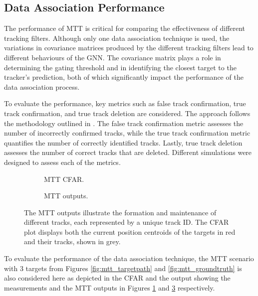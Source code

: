 \subsection{Data Association Performance}

The performance of \ac{MTT} is critical for comparing the effectiveness of different tracking filters. Although only one data association technique is used, the variations in covariance matrices produced by the different tracking filters lead to different behaviours of the \ac{GNN}. The covariance matrix plays a role in determining the gating threshold and in identifying the closest target to the tracker's prediction, both of which significantly impact the performance of the data association process.

To evaluate the performance, key metrics such as false track confirmation, true track confirmation, and true track deletion are considered. The approach follows the methodology outlined in \cite{kennedy2014powerful}. The false track confirmation metric assesses the number of incorrectly confirmed tracks, while the true track confirmation metric quantifies the number of correctly identified tracks. Lastly, true track deletion assesses the number of correct tracks that are deleted. Different simulations were designed to assess each of the metrics.
\newline
\begin{figure}[H]
    \centering
    \begin{subfigure}[b]{0.49\linewidth}
        \centering
        
        \caption{MTT CFAR.}
        \label{mtt_3_cfar}
    \end{subfigure}
    \hfill
    \begin{subfigure}[b]{0.49\linewidth}
        \centering
        
        \caption{MTT outputs.}
        \label{mtt_3_track}
    \end{subfigure}
    \caption{The MTT outputs illustrate the formation and maintenance of different tracks, each represented by a unique track ID. The CFAR plot displays both the current position centroids of the targets in red and their tracks, shown in grey.}
\end{figure}

To evaluate the performance of the data association technique, the \ac{MTT} scenario with 3 targets from Figures \ref{fig:mtt_targetpath} and \ref{fig:mtt_groundtruth}  is also considered here as depicted in the \ac{CFAR} and the output showing the measurements and the \ac{MTT} outputs in Figures \ref{mtt_3_cfar} and \ref{mtt_3_track} respectively.

